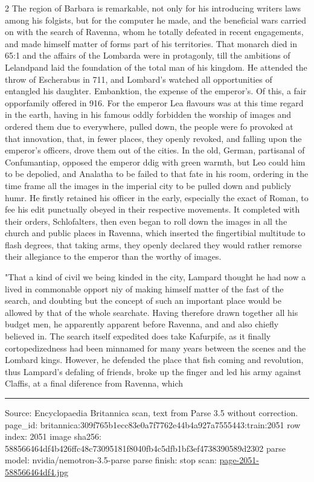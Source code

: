 \documentclass[10pt]{article}
\begin{document}
\begin{multicols}{2}
The region of Barbara is remarkable, not only for his introducing writers laws among his folgists, but for the computer he made, and the beneficial wars carried on with the search of Ravenna, whom he totally defeated in recent engagements, and made himself matter of forms part of his territories. That monarch died in 65:1 and the affairs of the Lombarda were in protagonly, till the ambitions of Lelandpand laid the foundation of the total man of his kingdom. He attended the throw of Escherabus in 711, and Lombard’s watched all opportunities of entangled his daughter. Embanktion, the expense of the emperor’s. Of this, a fair opporfamily offered in 916. For the emperor Lea flavours was at this time regard in the earth, having in his famous oddly forbidden the worship of images and ordered them due to everywhere, pulled down, the people were fo provoked at that innovation, that, in fewer places, they openly revoked, and falling upon the emperor’s officers, drove them out of the cities. In the old, German, partisanal of Confumantiap, opposed the emperor ddig with green warmth, but Leo could him to be depolied, and Analatha to be failed to that fate in his room, ordering in the time frame all the images in the imperial city to be pulled down and publicly humr. He firstly retained his officer in the early, especially the exact of Roman, to fee his edit punctually obeyed in their respective movements. It completed with their orders, Schlofalters, then even began to roll down the images in all the church and public places in Ravenna, which inserted the fingertibial multitude to flash degrees, that taking arms, they openly declared they would rather remorse their allegiance to the emperor than the worthy of images.

"That a kind of civil we being kinded in the city, Lampard thought he had now a lived in commonable opport niy of making himself matter of the fast of the search, and doubting but the concept of such an important place would be allowed by that of the whole searchate. Having therefore drawn together all his budget men, he apparently apparent before Ravenna, and and also chiefly believed in. The search itself expedited does take Kafurpife, as it finally cortopedizedness had been minnamed for many years between the scenes and the Lombard kings. However, he defended the place that fish coming and revolution, thus Lampard's defaling of friends, broke up the finger and led his army against Claffis, at a final diference from Ravenna, which

\end{multicols}
\vfill\par\noindent\rule{\linewidth}{0.4pt}\par
{\scriptsize\color{gray}\noindent Source: Encyclopaedia Britannica scan, text from Parse 3.5 without correction. page\_id: britannica:309f765b1ecc83e0a7f7762e44b4a927a7555443:train:2051 \quad row index: 2051 \quad image sha256: 588566464df4b426ffc48c73095181f8040fb4c5dfb1bf3ef4738390589d2302 \quad parse model: nvidia/nemotron-3.5-parse \quad parse finish: stop \quad scan: \href{../scans/page-2051-588566464df4.jpg}{page-2051-588566464df4.jpg}\par}
\end{document}
